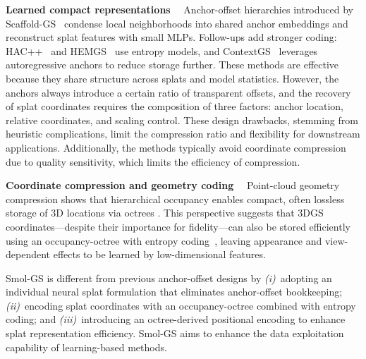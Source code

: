 \documentclass{article}
\newcommand{\ours}{Smol-GS\xspace}
\renewcommand{\paragraph}[1]{\noindent\textbf{#1}~~}
\begin{document}
%

%
%
%

\paragraph{Learned compact representations}
%
Anchor-offset hierarchies introduced by Scaffold-GS~\cite{lu2024scaffoldgs} condense local neighborhoods into shared anchor embeddings and reconstruct splat features with small MLPs. Follow-ups add stronger coding: HAC++~\cite{chen2025hac++} and HEMGS~\cite{liu2024hemgs} use entropy models, and ContextGS~\cite{wang2024contextgs} leverages autoregressive anchors to reduce storage further. These methods are effective because they share structure across splats and model statistics. However, the anchors always introduce a certain ratio of transparent offsets, and the recovery of splat coordinates requires the composition of three factors: anchor location, relative coordinates, and scaling control. These design drawbacks, stemming from heuristic complications, limit the compression ratio and flexibility for downstream applications. Additionally, the methods typically avoid coordinate compression due to quality sensitivity, which limits the efficiency of compression.

\paragraph{Coordinate compression and geometry coding}
Point-cloud geometry compression shows that hierarchical occupancy enables compact, often lossless storage of 3D locations via octrees \citep{schnabel2006octree,que2021voxelcontext,fu2022octattention,cui2023octformer}. This perspective suggests that 3DGS coordinates---despite their importance for fidelity---can also be stored efficiently using an occupancy-octree with entropy coding~\cite{huffman2007method}, leaving appearance and view-dependent effects to be learned by low-dimensional features.

%
\ours is different from previous anchor-offset designs by {\em (i)}~adopting an individual neural splat formulation that eliminates anchor-offset bookkeeping; {\em (ii)}~encoding splat coordinates with an occupancy-octree combined with entropy coding; and {\em (iii)}~introducing an octree-derived positional encoding to enhance splat representation efficiency. \ours aims to enhance the data exploitation capability of learning-based methods.
%


%
\end{document}
